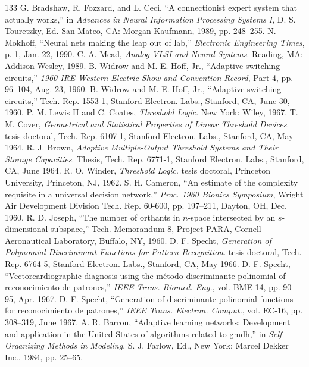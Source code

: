 \documentclass[10pt,twocolumn]{article}
\begin{document}
\begin{thebibliography}{133}
 G. Bradshaw, R. Fozzard, and L. Ceci, ``A connectionist expert system that actually works,'' in \textit{Advances in Neural Information Processing Systems I}, D. S. Touretzky, Ed. San Mateo, CA: Morgan Kaufmann, 1989, pp. 248--255.
 N. Mokhoff, ``Neural nets making the leap out of lab,'' \textit{Electronic Engineering Times}, p. 1, Jan. 22, 1990.
 C. A. Mead, \textit{Analog VLSI and Neural Systems}. Reading, MA: Addison-Wesley, 1989.
 B. Widrow and M. E. Hoff, Jr., ``Adaptive switching circuits,'' \textit{1960 IRE Western Electric Show and Convention Record}, Part 4, pp. 96--104, Aug. 23, 1960.
 B. Widrow and M. E. Hoff, Jr., ``Adaptive switching circuits,'' Tech. Rep. 1553-1, Stanford Electron. Labs., Stanford, CA, June 30, 1960.
 P. M. Lewis II and C. Coates, \textit{Threshold Logic}. New York: Wiley, 1967.
 T. M. Cover, \textit{Geometrical and Statistical Properties of Linear Threshold Devices}. tesis doctoral, Tech. Rep. 6107-1, Stanford Electron. Labs., Stanford, CA, May 1964.
 R. J. Brown, \textit{Adaptive Multiple-Output Threshold Systems and Their Storage Capacities}. Thesis, Tech. Rep. 6771-1, Stanford Electron. Labs., Stanford, CA, June 1964.
 R. O. Winder, \textit{Threshold Logic}. tesis doctoral, Princeton University, Princeton, NJ, 1962.
 S. H. Cameron, ``An estimate of the complexity requisite in a universal decision network,'' \textit{Proc. 1960 Bionics Symposium}, Wright Air Development Division Tech. Rep. 60-600, pp. 197--211, Dayton, OH, Dec. 1960.
 R. D. Joseph, ``The number of orthants in $n$-space intersected by an $s$-dimensional subspace,'' Tech. Memorandum 8, Project PARA, Cornell Aeronautical Laboratory, Buffalo, NY, 1960.
 D. F. Specht, \textit{Generation of Polynomial Discriminant Functions for Pattern Recognition}. tesis doctoral, Tech. Rep. 6764-5, Stanford Electron. Labs., Stanford, CA, May 1966.
 D. F. Specht, ``Vectorcardiographic diagnosis using the método discriminante polinomial of reconocimiento de patrones,'' \textit{IEEE Trans. Biomed. Eng.}, vol. BME-14, pp. 90--95, Apr. 1967.
 D. F. Specht, ``Generation of discriminante polinomial functions for reconocimiento de patrones,'' \textit{IEEE Trans. Electron. Comput.}, vol. EC-16, pp. 308--319, June 1967.
 A. R. Barron, ``Adaptive learning networks: Development and application in the United States of algorithms related to gmdh,'' in \textit{Self-Organizing Methods in Modeling}, S. J. Farlow, Ed., New York: Marcel Dekker Inc., 1984, pp. 25--65.

\end{thebibliography}
\end{document}
